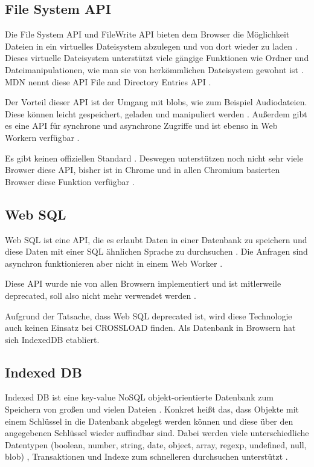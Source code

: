 \subsection{File System API}
Die File System \ac{API} und FileWrite \ac{API} bieten dem Browser die Möglichkeit Dateien in ein virtuelles Dateisystem abzulegen und von dort wieder zu laden \autocite{Hajian2019} \autocite{storage-for-the-web}. Dieses virtuelle Dateisystem unterstützt viele gängige Funktionen wie Ordner und Dateimanipulationen, wie man sie von herkömmlichen Dateisystem gewohnt ist \autocite{mdn-file-system}. \ac{MDN} nennt diese \ac{API} File and Directory Entries \ac{API} \autocite{mdn-file-system}. 

Der Vorteil dieser \ac{API} ist der Umgang mit \acp{blob}, wie zum Beispiel Audiodateien. Diese können leicht gespeichert, geladen und manipuliert werden \autocite{mdn-file-system}. Außerdem gibt es eine \ac{API} für synchrone und asynchrone Zugriffe und ist ebenso in Web Workern verfügbar \autocite{Hajian2019}. 

Es gibt keinen offiziellen Standard \autocite{mdn-file-system} \autocite{caniuse-filesystem}. Deswegen unterstützen noch nicht sehr viele Browser diese \ac{API}, bisher ist in Chrome und in allen Chromium basierten Browser diese Funktion verfügbar \autocite{caniuse-filesystem}.

\subsection{Web SQL}
Web SQL ist eine \ac{API}, die es erlaubt Daten in einer Datenbank zu speichern und diese Daten mit einer SQL ähnlichen Sprache zu durchsuchen \autocite{w3-web-sql}. Die Anfragen sind asynchron funktionieren aber nicht in einem Web Worker \autocite{Hajian2019}.

Diese \ac{API} wurde nie von allen Browsern implementiert und ist mitlerweile deprecated, soll also nicht mehr verwendet werden \autocite{Hajian2019}.

Aufgrund der Tatsache, dass Web SQL deprecated ist, wird diese Technologie auch keinen Einsatz bei CROSSLOAD finden. Als Datenbank in Browsern hat sich IndexedDB etabliert.

\subsection{Indexed DB}
Indexed DB ist eine key-value NoSQL objekt-orientierte Datenbank zum Speichern von großen und vielen Dateien \autocite{Hajian2019}. Konkret heißt das, dass Objekte mit einem Schlüssel in die Datenbank abgelegt werden können und diese über den angegebenen Schlüssel wieder auffindbar sind. Dabei werden viele unterschiedliche Datentypen (boolean, number, string, date, object, array, regexp, undefined, null, \ac{blob}) \autocite{mdn-indexeddb}, Transaktionen und Indexe zum schnelleren durchsuchen unterstützt \autocite{Sheppard2017}. 


